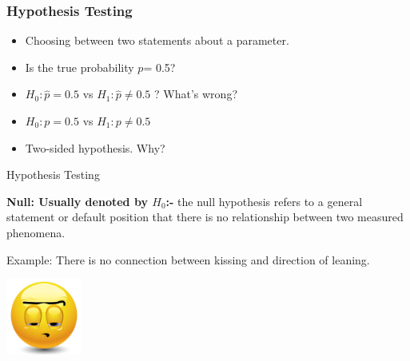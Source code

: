 \documentclass{beamer}\usepackage[]{graphicx}\usepackage[]{color}
\begin{document}
\begin{frame}[fragile]

\frametitle{Hypothesis Testing}

\begin{itemize}
\item Choosing between two statements about a parameter. \pause
\item Is the true probability $p$= 0.5? \pause
\item $H_0: \hat{p}=0.5$ vs $H_1: \hat{p} \neq 0.5$ ? \pause What's wrong? \pause
\item $H_0: p=0.5$ vs $H_1:p \neq 0.5$ \pause
\item Two-sided hypothesis. Why? \pause
\end{itemize}

\end{frame}

\begin{frame}{Hypothesis Testing}

{\bf Null: Usually denoted by $H_0$:-} the null hypothesis refers to a general statement or default position that there is no relationship between two measured phenomena. \pause \newline

Example: There is no connection between kissing and direction of leaning. \pause

\begin{center}
\includegraphics[width=2.5cm,height=2.3 cm]{pessimistic.png}
\end{center}

\end{frame}
\end{document}
